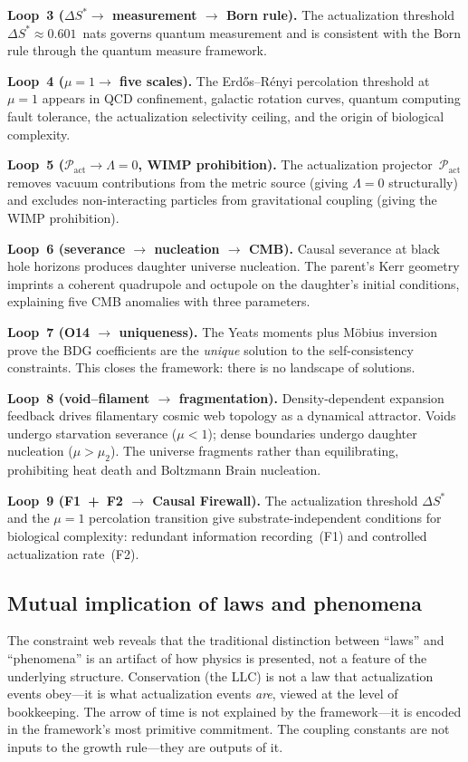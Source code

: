 \documentclass[11pt,a4paper]{article}
\theoremstyle{plain}
\theoremstyle{definition}
\theoremstyle{remark}
\newcommand{\Pact}{\mathcal{P}_{\mathrm{act}}}
\begin{document}
\textbf{Loop~3 ($\Delta S^* \to$ measurement $\to$ Born rule).}
The actualization threshold $\Delta S^* \approx 0.601$~nats governs quantum
measurement and is consistent with the Born rule through the quantum measure
framework.

\textbf{Loop~4 ($\mu = 1 \to$ five scales).}
The Erd\H{o}s--R\'enyi percolation threshold at $\mu = 1$ appears in QCD
confinement, galactic rotation curves, quantum computing fault tolerance, the
actualization selectivity ceiling, and the origin of biological complexity.

\textbf{Loop~5 ($\Pact \to \Lambda = 0$, WIMP prohibition).}
The actualization projector~$\Pact$ removes vacuum contributions from the metric
source (giving $\Lambda = 0$ structurally) and excludes non-interacting
particles from gravitational coupling (giving the WIMP prohibition).

\textbf{Loop~6 (severance $\to$ nucleation $\to$ CMB).}
Causal severance at black hole horizons produces daughter universe nucleation.
The parent's Kerr geometry imprints a coherent quadrupole and octupole on the
daughter's initial conditions, explaining five CMB anomalies with three
parameters.

\textbf{Loop~7 (O14 $\to$ uniqueness).}
The Yeats moments plus M\"obius inversion prove the BDG coefficients are the
\emph{unique} solution to the self-consistency constraints.  This closes the
framework: there is no landscape of solutions.

\textbf{Loop~8 (void--filament $\to$ fragmentation).}
Density-dependent expansion feedback drives filamentary cosmic web topology as a
dynamical attractor.  Voids undergo starvation severance ($\mu < 1$); dense
boundaries undergo daughter nucleation ($\mu > \mu_2$).  The universe fragments
rather than equilibrating, prohibiting heat death and Boltzmann Brain nucleation.

\textbf{Loop~9 (F1~+~F2 $\to$ Causal Firewall).}
The actualization threshold $\Delta S^*$ and the $\mu = 1$ percolation transition
give substrate-independent conditions for biological complexity: redundant
information recording~(F1) and controlled actualization rate~(F2).

\subsection{Mutual implication of laws and phenomena}\label{sec:mutual}

The constraint web reveals that the traditional distinction between ``laws'' and
``phenomena'' is an artifact of how physics is presented, not a feature of the
underlying structure.  Conservation (the LLC) is not a law that actualization
events obey---it is what actualization events \emph{are}, viewed at the level of
bookkeeping.  The arrow of time is not explained by the framework---it is
encoded in the framework's most primitive commitment.  The coupling constants
are not inputs to the growth rule---they are outputs of it.
\end{document}
